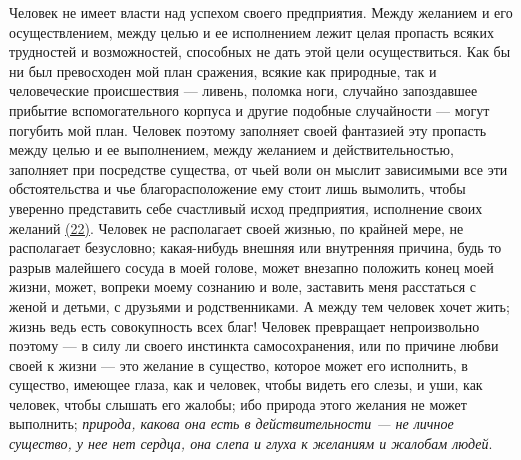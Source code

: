 \documentclass[12pt]{article}
\begin{document}
Человек не имеет власти над успехом своего предприятия. Между желанием и его осуществлением, между целью и ее исполнением лежит целая пропасть всяких трудностей и возможностей, способных не дать этой цели осуществиться. Как бы ни был превосходен мой план сражения, всякие как природные, так и человеческие происшествия --- ливень, поломка ноги, случайно запоздавшее прибытие вспомогательного корпуса и другие подобные случайности --- могут погубить мой план. Человек поэтому заполняет своей фантазией эту пропасть между целью и ее выполнением, между желанием и действительностью, заполняет при посредстве существа, от чьей воли он мыслит зависимыми все эти обстоятельства и чье благорасположение ему стоит лишь вымолить, чтобы уверенно представить себе счастливый исход предприятия, исполнение своих желаний \hyperlink{22}{(22)}\hypertarget{b22}{}. Человек не располагает своей жизнью, по крайней мере, не располагает безусловно; какая-нибудь внешняя или внутренняя причина, будь то разрыв малейшего сосуда в моей голове, может внезапно положить конец моей жизни, может, вопреки моему сознанию и воле, заставить меня расстаться с женой и детьми, с друзьями и родственниками. А между тем человек хочет жить; жизнь ведь есть совокупность всех благ! Человек превращает непроизвольно поэтому --- в силу ли своего инстинкта самосохранения, или по причине любви своей к жизни --- это желание в существо, которое может его исполнить, в существо, имеющее глаза, как и человек, чтобы видеть его слезы, и уши, как человек, чтобы слышать его жалобы; ибо природа этого желания не может выполнить; \emph{природа, какова она есть в действительности --- не личное существо, у нее нет сердца, она слепа и глуха к желаниям и жалобам людей}. 
\end{document}
